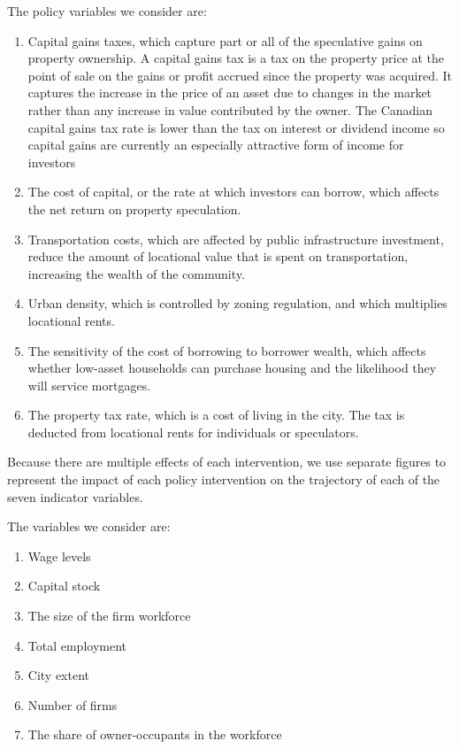 The policy variables we consider are: 
\begin{enumerate}
\item Capital gains taxes, which capture part or all of the speculative gains on property ownership.  A \gls{capital gains tax}  is a tax on the property price at the point of sale on the gains or profit accrued since the property was acquired. It captures the increase in the price of an asset due to changes in the market rather than any increase in value contributed by the owner. The Canadian capital gains tax rate is lower than the tax on interest or dividend income so capital gains are currently an especially attractive form of income for investors%
\item The cost of capital, or the rate at which investors can borrow, which affects the net return on property speculation.
\item Transportation costs, which are affected by public infrastructure investment, reduce the amount of locational value that is spent on transportation, increasing the wealth of the community. 
\item Urban density, which is controlled by zoning regulation, and which multiplies locational rents. 
\item The sensitivity of the cost of borrowing to borrower wealth, which affects whether low-asset households can purchase housing and the likelihood they will service mortgages.
\item The property tax rate, which is a cost of living in the city. The tax is deducted from locational rents for individuals or speculators.
\end{enumerate}


Because there are multiple effects of each intervention, we use separate figures to represent the impact of each policy intervention on the trajectory of each of the seven indicator variables. %



The variables we consider are:
\begin{enumerate}
    \item Wage levels
    \item Capital stock
    \item The size of the firm workforce
    \item Total employment
    \item City extent
    \item Number of firms
    \item The share of owner-occupants in the workforce
\end{enumerate} 

